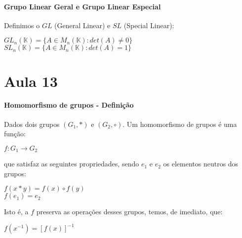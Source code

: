 \documentclass[12pt]{article}
\begin{document}
\paragraph{Grupo Linear Geral e Grupo Linear Especial\\}
	Definimos o $GL$ (General Linear) e $SL$ (Special Linear):
	\begin{center}
		$GL_n(\mathbb{K}) = \lbrace A \in M_n(\mathbb{K}): det(A) \neq 0 \rbrace$\\[5pt]
		$SL_n(\mathbb{K}) = \lbrace A \in M_n(\mathbb{K}): det(A) = 1 \rbrace$
	\end{center}
	
\newpage
\section*{Aula 13}
\paragraph*{Homomorfismo de grupos - Definição\\}
	Dados dois grupos $(G_1,*)$ e $(G_2,\circ)$. Um homomorfismo de grupos é uma função:
	\begin{center} $f: G_1 \rightarrow G_2$ \end{center}
	que satisfaz as seguintes propriedades, sendo $e_1$ e $e_2$ os elementos neutros dos grupos:
	\begin{center} $f(x * y) = f(x) \circ f(y)$ \\ $f(e_1) = e_2$ \end{center}
	Isto é, a $f$ preserva as operações desses grupos, temos, de imediato, que:
	\begin{center} $f(x^{-1}) = [f(x)]^{-1}$ \end{center}
\end{document}
